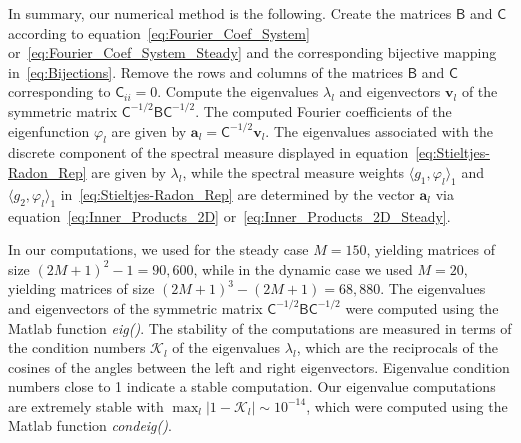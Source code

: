 \documentclass[leqno,onefignum,onetabnum]{siamltex1213}
\newcommand{\Bm}{\mathsf{B}}
\newcommand{\Cm}{\mathsf{C}}
\newcommand{\vecv}{\boldsymbol{v}}
\newcommand{\veca}{\boldsymbol{a}}
\begin{document}
In summary, our numerical method is the following. Create the matrices
$\Bm$ and $\Cm$ according to equation~\eqref{eq:Fourier_Coef_System}
or~\eqref{eq:Fourier_Coef_System_Steady} and the corresponding
bijective mapping in~\eqref{eq:Bijections}. Remove the rows
and columns of the matrices $\Bm$ and $\Cm$ corresponding to
$\Cm_{ii}=0$. Compute the eigenvalues $\lambda_l$ and eigenvectors $\vecv_l$ of
the symmetric matrix $\Cm^{-1/2}\Bm\Cm^{-1/2}$. The computed Fourier
coefficients of the eigenfunction $\varphi_l$ are given by
$\veca_l=\Cm^{-1/2}\vecv_l$. The eigenvalues associated with the
discrete component of the spectral measure displayed in
equation~\eqref{eq:Stieltjes-Radon_Rep} are given by $\lambda_l$, while the
spectral measure weights $\langle g_1,\varphi_l\rangle_1$ and $\langle g_2,\varphi_l\rangle_1$
in~\eqref{eq:Stieltjes-Radon_Rep} are determined by the vector
$\veca_l$ via equation~\eqref{eq:Inner_Products_2D}
or~\eqref{eq:Inner_Products_2D_Steady}.     



In our computations, we used for the steady case $M=150$, yielding
matrices of size $(2M+1)^2-1=90,600$, while in the dynamic case we used
$M=20$, yielding matrices of size $(2M+1)^3-(2M+1)=68,880$. The
eigenvalues and eigenvectors of the symmetric matrix
$\Cm^{-1/2}\Bm\Cm^{-1/2}$ were computed using the Matlab function
\emph{eig()}. The stability of the computations are measured in terms
of the condition numbers $\mathcal{K}_l$ of the eigenvalues $\lambda_l$,
which are the reciprocals of the cosines of the angles between the
left and right eigenvectors. Eigenvalue condition numbers close to 1
indicate a stable computation. Our eigenvalue computations are
extremely stable with $\max_l|1-\mathcal{K}_l|\sim10^{-14}$, which were
computed using the Matlab function \emph{condeig()}.
\end{document}
